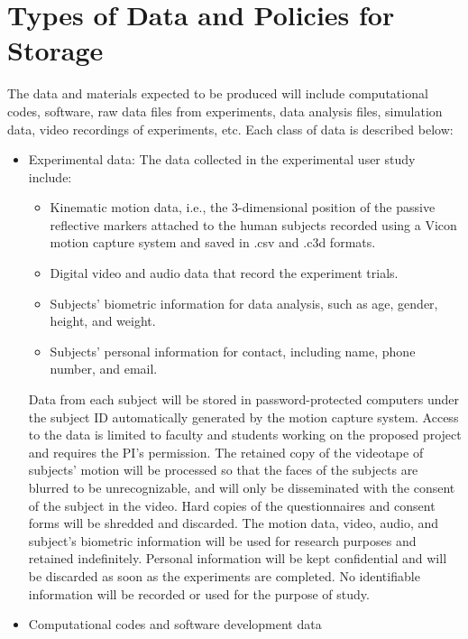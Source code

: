 \section{Types of Data and Policies for Storage}\label{sec:type}
The data and materials expected to be produced will include computational codes, software, raw data files from experiments, data analysis files, simulation data, video recordings of experiments, etc. Each class of data is described below:
\begin{itemize}	

\item Experimental data: The data collected in the experimental user study include: 
\begin{itemize}
\item Kinematic motion data, i.e., the 3-dimensional position of the passive reflective markers attached to the human subjects recorded using a Vicon motion capture system and saved in .csv and .c3d formats.
\item Digital video and audio data that record the experiment trials.
\item Subjects’ biometric information for data analysis, such as age, gender, height, and weight.
\item Subjects’ personal information for contact, including name, phone number, and email.
\end{itemize}

Data from each subject will be stored in password-protected computers under the subject ID automatically generated by the motion capture system. Access to the data is limited to faculty and students working on the proposed project and requires the PI’s permission. The retained copy of the videotape of subjects’ motion will be processed so that the faces of the subjects are blurred to be unrecognizable, and will only be disseminated with the consent of the subject in the video. Hard copies of the questionnaires and consent forms will be shredded and discarded. The motion data, video, audio, and subject’s biometric information will be used for research purposes and retained indefinitely. Personal information will be kept confidential and will be discarded as soon as the experiments are completed. No identifiable information will be recorded or used for the purpose of study.

\item Computational codes and software development data


\end{itemize}
